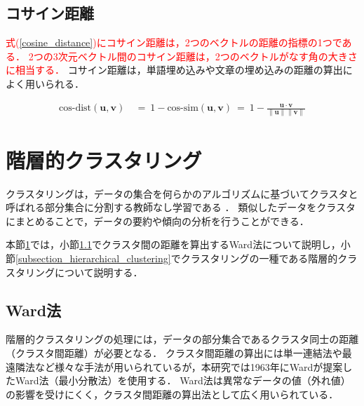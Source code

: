 \documentclass[12pt,a4j]{jreport}
\begin{document}
\subsection{コサイン距離}
\label{subsection_cosine_distance}
\textcolor{red}{
式(\ref{cosine_distance})にコサイン距離は，2つのベクトルの距離の指標の1つである．
2つの3次元ベクトル間のコサイン距離は，2つのベクトルがなす角の大きさに相当する．
}
コサイン距離は，単語埋め込みや文章の埋め込みの距離の算出によく用いられる．

\begin{align}
  \text{cos-dist}\left(\bm{u}, \bm{v}\right) ~&=~
  1 -
  \text{cos-sim}\left(\bm{u}, \bm{v}\right) ~=~
  1 - \frac{\bm{u} \cdot \bm{v}}{\|\bm{u}\|\|\bm{v}\|}
  \label{cosine_distance}
\end{align}

\section{階層的クラスタリング}
\label{section_clustering}
クラスタリングは，データの集合を何らかのアルゴリズムに基づいてクラスタと呼ばれる部分集合に分割する教師なし学習である
．
類似したデータをクラスタにまとめることで，データの要約や傾向の分析を行うことができる．

本節\ref{section_clustering}では，小節\ref{subsection_wards_method}でクラスタ間の距離を算出するWard法について説明し，小節\ref{subsection_hierarchical_clustering}でクラスタリングの一種である階層的クラスタリングについて説明する．



\subsection{Ward法}
\label{subsection_wards_method}
階層的クラスタリングの処理には，データの部分集合であるクラスタ同士の距離（クラスタ間距離）が必要となる．
クラスタ間距離の算出には単一連結法や最遠隣法など様々な手法が用いられているが，本研究では1963年にWardが提案したWard法（最小分散法）を使用する\cite{murtagh_wards_2014}．
Ward法は異常なデータの値（外れ値）の影響を受けにくく，クラスタ間距離の算出法として広く用いられている．
\end{document}
